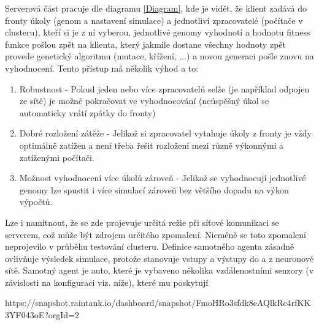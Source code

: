 Serverová část pracuje dle diagramu \ref{Diagram}, kde je vidět, že klient zadává do fronty úkoly (genom a nastavení simulace) a jednotliví zpracovatelé (počítače v clusteru), kteří si je z ní vyberou, jednotlivé genomy vyhodnotí a hodnotu fitness funkce pošlou zpět na klienta, který jakmile dostane všechny hodnoty zpět provede genetický algoritmu (mutace, křížení, ...) a novou generaci pošle znovu na vyhodnocení.
Tento přístup má několik výhod a to:
\begin{enumerate}
	\item Robustnost - Pokud jeden nebo více zpracovatelů selže (je například odpojen ze sítě) je možné pokračovat ve vyhodnocování (neúspěšný úkol se automaticky vrátí zpátky do fronty)
	\item Dobré rozložení zátěže - Jelikož si zpracovatel vytahuje úkoly z fronty je vždy optimálně zatížen a není třeba řešit rozložení mezi různě výkonnými a zatíženými počítači.
	\item Možnost vyhodnocení více úkolů zároveň - Jelikož se vyhodnocují jednotlivé genomy lze spustit i více simulací zároveň bez většího dopadu na výkon výpočtů.
\end{enumerate}

Lze i namítnout, že se zde projevuje určitá režie při síťové komunikaci se serverem, což může být zdrojem určitého zpomalení. Nicméně se toto zpomalení neprojevilo v průběhu testování clusteru. 
Definice samotného agenta zásadně ovlivňuje výsledek simulace, protože stanovuje vstupy a výstupy do a z neuronové sítě. 
Samotný agent je auto, které je vybaveno několika vzdálenostními senzory (v závislosti na konfiguraci viz. níže), které mu poskytují 

https://snapshot.raintank.io/dashboard/snapshot/FmoHRo3sfdk8eAQlkRc4rfKK3YF043oE?orgId=2
